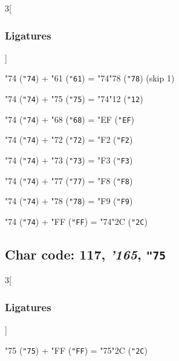 \documentclass{article}
\newlength{\maxcharwidth}
\begin{document}
\begin{multicols}{3}[\subsubsection{Ligatures}]

{\testfont\char"74\noboundary} ({\tt"74}) + {\testfont\char"61\noboundary} ({\tt"61}) = {\testfont\char"74\noboundary}{\testfont\char"78\noboundary} ({\tt"78})  (skip 1)

{\testfont\char"74\noboundary} ({\tt"74}) + {\testfont\char"75\noboundary} ({\tt"75}) = {\testfont\char"74\noboundary}{\testfont\char"12\noboundary} ({\tt"12}) 

{\testfont\char"74\noboundary} ({\tt"74}) + {\testfont\char"68\noboundary} ({\tt"68}) = {\testfont\char"EF\noboundary} ({\tt"EF}) 

{\testfont\char"74\noboundary} ({\tt"74}) + {\testfont\char"72\noboundary} ({\tt"72}) = {\testfont\char"F2\noboundary} ({\tt"F2}) 

{\testfont\char"74\noboundary} ({\tt"74}) + {\testfont\char"73\noboundary} ({\tt"73}) = {\testfont\char"F3\noboundary} ({\tt"F3}) 

{\testfont\char"74\noboundary} ({\tt"74}) + {\testfont\char"77\noboundary} ({\tt"77}) = {\testfont\char"F8\noboundary} ({\tt"F8}) 

{\testfont\char"74\noboundary} ({\tt"74}) + {\testfont\char"78\noboundary} ({\tt"78}) = {\testfont\char"F9\noboundary} ({\tt"F9}) 

{\testfont\char"74\noboundary} ({\tt"74}) + {\testfont\char"FF\noboundary} ({\tt"FF}) = {\testfont\char"74\noboundary}{\testfont\char"2C\noboundary} ({\tt"2C}) 

\end{multicols}

\subsection{Char code: 117, {\it'165}, {\tt"75}}
\label{char_117}


\begin{multicols}{3}[\subsubsection{Ligatures}]

{\testfont\char"75\noboundary} ({\tt"75}) + {\testfont\char"FF\noboundary} ({\tt"FF}) = {\testfont\char"75\noboundary}{\testfont\char"2C\noboundary} ({\tt"2C}) 

\end{multicols}
\end{document}
